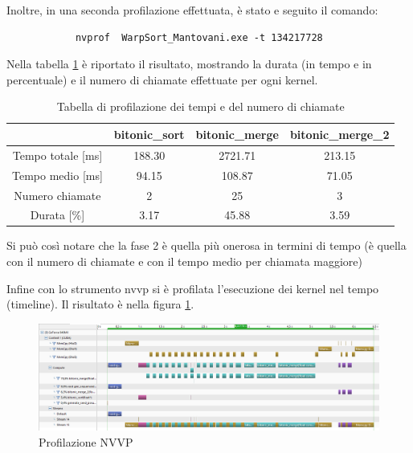 \documentclass[a4paper, 11pt]{article}
\begin{document}
		Inoltre, in una seconda profilazione effettuata, è stato e seguito il comando:
		\begin{verbatim}
			nvprof  WarpSort_Mantovani.exe -t 134217728
		\end{verbatim}
		Nella tabella \ref{tab:nvprof} è riportato il risultato, mostrando la durata (in tempo e in percentuale) e il numero di chiamate 
		effettuate per ogni kernel.					
		\begin{table}[h]			
			\centering
			\begin{tabular}{c|ccc}
				                  & bitonic\_sort & bitonic\_merge & bitonic\_merge\_2 \\
				\hline
				Tempo totale [ms] & 188.30        &        2721.71 &            213.15 \\
				Tempo medio  [ms] &  94.15        &         108.87 &             71.05 \\
				Numero chiamate   &      2        &             25 &                 3 \\	
				Durata [\%]       &   3.17        &          45.88 &              3.59 \\		
			\end{tabular}
			\caption{Tabella di profilazione dei tempi e del numero di 
			chiamate}
			\label{tab:nvprof}
		\end{table}			
		Si può così notare che la fase 2 è quella più onerosa in termini di tempo (è quella con il numero di chiamate
		e con il tempo medio per chiamata maggiore)
		
		Infine con lo strumento nvvp si è profilata l'esecuzione dei kernel nel tempo (timeline). Il risultato è nella figura \ref{fig:nvvp}.
		
		\begin{figure}
			\centering
			\includegraphics[width=0.99\linewidth]{img/nvvp}
			\caption{Profilazione NVVP}
			\label{fig:nvvp}
		\end{figure}
		
\end{document}
